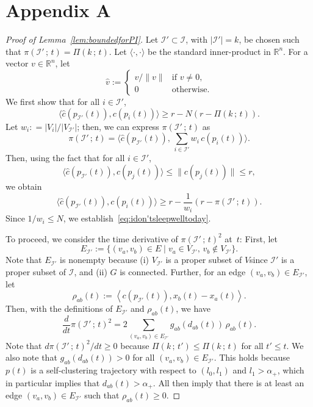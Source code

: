 \documentclass[10pt,twocolumn,twoside]{IEEEtran}
\newcommand{\R}{\mathbb{R}}
\renewcommand{\cal}{\mathcal}
\renewcommand{\(}{\left (}
\renewcommand{\)}{\right )}
\renewcommand{\;}{\,;\,}
\begin{document}



\section*{Appendix A}
\begin{proof}[Proof of Lemma~\ref{lem:boundedforPI}] 
Let $\cal{I}' \subset \cal{I}$, with $|\cal{I}'| = k$, be chosen such that  
$
\pi(\cal{I}'\; t) = \Pi(k\; t)  
$. 
Let $\langle\cdot, \cdot \rangle $ be the standard inner-product in $\R^n$. For a vector $v\in \R^n$, let 
$$
\hat v :=
\left\{
\begin{array}{ll}
v /\|v\| & \mbox{if } v \neq 0, \\
0  & \mbox{otherwise}.
\end{array}
\right. 
$$  
We first show that  for all $i\in \cal{I}'$, 
\begin{equation}\label{eq:idon'tsleepwelltoday}
\langle \hat c(p_{\cal{I}'}(t)), c(p_{i}(t)) \rangle \ge r - N(r - \Pi(k\; t)).
\end{equation}
Let $w_i: = |V_i| / |V_{\cal{I}'}|$; then, we can express $\pi(\cal{I}'\; t)$ as 
$$
\pi(\cal{I}'\; t) =\langle \hat c(p_{\cal{I}'}(t)),\, \sum_{i\in \cal{I}'}w_i \, c(p_i(t)) \rangle. 
$$
Then, using the fact that for all $i\in \cal{I}' $, 
$$\langle \hat c(p_{\cal{I}'}(t)), c(p_j(t)) \rangle \le \|c(p_j(t))\| \le r,$$  
we obtain
$$
 \langle \hat c(p_{\cal{I}'}(t)), c(p_i(t)) \rangle \ge  r - \frac{1}{w_i} \(r - \pi(\cal{I}'\; t)\).  
$$
Since $1/w_i \le N$, we establish~\eqref{eq:idon'tsleepwelltoday}.  

To proceed, we consider the time derivative of $\pi(\cal{I}'\; t)^2$ at~$t$:  First, let  
$$
E_{\cal{I}'}:=\{(v_{a},v_{b}) \in E \mid v_{a}\in V_{\cal{I}'},\, v_{b} \notin V_{\cal{I}'} \}. 
$$ 
Note that $E_{\cal{I}'}$ is nonempty because (i) $V_{\cal{I}'}$ is a proper subset of $V$since $\cal{I}'$ is a proper subset of $\cal{I}$, and (ii) $G$ is connected. Further, for an edge $(v_a, v_b)\in E_{\cal{I}'}$, let 
$$\rho_{ab}(t) := \left\langle c(p_{\cal{I}'}(t)) , x_{b}(t) - x_{a}(t) \right\rangle.$$ 
Then, with the definitions of $E_{\cal{I}'}$ and $\rho_{ab}(t)$, we have 
\begin{equation}\label{eq:lajitong}
\frac{d}{dt}\pi(\cal{I}'\; t)^2 = 2\sum_{(v_{a},v_{b}) \in E_{\cal{I}'} } g_{ab}(d_{ab}(t))\, \rho_{ab}(t).
\end{equation} 
Note that $d\pi(\cal{I}'\; t)^2/dt \ge 0$ because $\Pi(k\; t') \le \Pi(k\; t) $ for all $t' \le t$.  We also note that $g_{ab}(d_{ab}(t)) > 0$ for all $(v_a,v_b) \in E_{\cal{I}'}$. This holds because $p(t)$ is a self-clustering trajectory with respect to $(l_0, l_1)$ and $l_1 > \alpha_+$, which in particular implies that $d_{ab}(t) > \alpha_+$. 
All then imply that there is at least an edge $(v_a,v_b) \in E_{\cal{I}'}$ such that 
$\rho_{ab}(t) \ge 0$. 



\end{proof}
\end{document}
